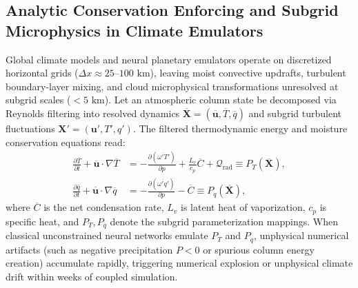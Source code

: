 \subsection{Analytic Conservation Enforcing and Subgrid Microphysics in Climate Emulators}
\label{sec:analytic_conservation_subgrid}
Global climate models and neural planetary emulators operate on discretized horizontal grids ($\Delta x \approx 25\text{--}100\text{ km}$), leaving moist convective updrafts, turbulent boundary-layer mixing, and cloud microphysical transformations unresolved at subgrid scales ($< 5\text{ km}$). Let an atmospheric column state be decomposed via Reynolds filtering into resolved dynamics $\overline{\mathbf{X}} = (\overline{\mathbf{u}}, \overline{T}, \overline{q})$ and subgrid turbulent fluctuations $\mathbf{X}' = (\mathbf{u}', T', q')$. The filtered thermodynamic energy and moisture conservation equations read:
\begin{align}
    \frac{\partial \overline{T}}{\partial t} + \overline{\mathbf{u}} \cdot \nabla \overline{T} &= -\frac{\partial (\overline{\omega' T'})}{\partial p} + \frac{L_v}{c_p} \overline{C} + \mathcal{Q}_{\text{rad}} \equiv P_T(\overline{\mathbf{X}}), \label{eq:subgrid_heating} \\
    \frac{\partial \overline{q}}{\partial t} + \overline{\mathbf{u}} \cdot \nabla \overline{q} &= -\frac{\partial (\overline{\omega' q'})}{\partial p} - \overline{C} \equiv P_q(\overline{\mathbf{X}}), \label{eq:subgrid_moistening}
\end{align}
where $\overline{C}$ is the net condensation rate, $L_v$ is latent heat of vaporization, $c_p$ is specific heat, and $P_T, P_q$ denote the subgrid parameterization mappings. When classical unconstrained neural networks emulate $P_T$ and $P_q$, unphysical numerical artifacts (such as negative precipitation $P < 0$ or spurious column energy creation) accumulate rapidly, triggering numerical explosion or unphysical climate drift within weeks of coupled simulation.

